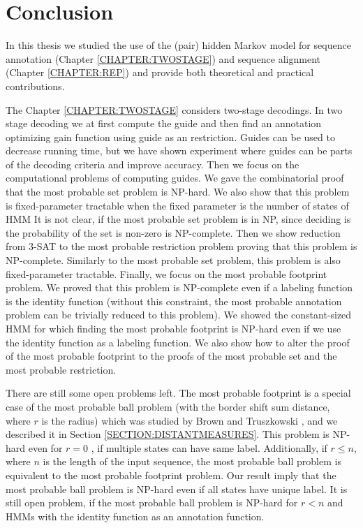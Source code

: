 \chapter{Conclusion}

In this thesis we studied the use of the (pair) hidden Markov model for
sequence annotation (Chapter \ref{CHAPTER:TWOSTAGE}) and sequence alignment
(Chapter \ref{CHAPTER:REP}) and provide both theoretical and practical
contributions.

The Chapter \ref{CHAPTER:TWOSTAGE} considers two-stage decodings. In two stage
decoding we at first compute the guide and then find an annotation optimizing
gain function using guide as an restriction. Guides can be used to decrease
running time, but we have shown experiment where guides can be parts of the
decoding criteria and improve accuracy. Then we focus on the computational
problems of computing guides.  We gave the combinatorial proof that the most
probable set problem is NP-hard.  We also show that this problem is
fixed-parameter tractable when the fixed parameter is the number of states of
HMM It is not clear, if the most probable set problem is in NP, since deciding
is the probability of the set is non-zero is NP-complete. Then we show
reduction from 3-SAT to the most probable restriction problem proving that this
problem is NP-complete. Similarly to the most probable set problem, this
problem is also fixed-parameter tractable.  Finally, we focus on the most
probable footprint problem. We proved that this problem is NP-complete even if
a labeling function is the identity function (without this constraint, the most
probable annotation problem can be trivially reduced to this problem). We
showed the constant-sized HMM for which finding the most probable footprint is
NP-hard even if we use the identity function as a labeling function. We also
show how to alter the proof of the most probable footprint to the proofs of the
most probable set and the most probable restriction. 

There are still some open problems left. The most probable footprint is a
special case of the most probable ball problem (with the border shift sum
distance, where $r$ is the radius) which was studied by Brown and
Truszkowski \cite{Brown2010}, and we described it in Section
\ref{SECTION:DISTANTMEASURES}.  This problem is NP-hard even for $r=0$
\cite{Brown2010}, if multiple states can have same label. Additionally, if
$r\leq n$, where $n$ is the length of the input sequence, the most probable
ball problem is equivalent to the most probable footprint problem. Our result
imply that the most probable ball problem is NP-hard even if all states have
unique label. It is still open problem, if the most probable ball problem is
NP-hard for $r<n$ and HMMs with the identity function as an annotation
function. 

